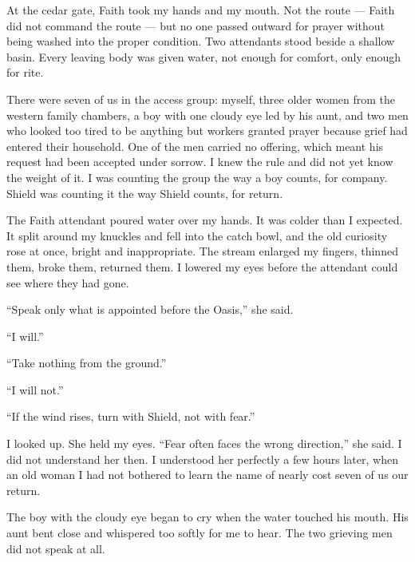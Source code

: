 At the cedar gate, Faith took my hands and my mouth. Not the route --- Faith did not command the route --- but no one passed outward for prayer without being washed into the proper condition. Two attendants stood beside a shallow basin. Every leaving body was given water, not enough for comfort, only enough for rite.\par

There were seven of us in the access group: myself, three older women from the western family chambers, a boy with one cloudy eye led by his aunt, and two men who looked too tired to be anything but workers granted prayer because grief had entered their household. One of the men carried no offering, which meant his request had been accepted under sorrow. I knew the rule and did not yet know the weight of it. I was counting the group the way a boy counts, for company. Shield was counting it the way Shield counts, for return.\par

The Faith attendant poured water over my hands. It was colder than I expected. It split around my knuckles and fell into the catch bowl, and the old curiosity rose at once, bright and inappropriate. The stream enlarged my fingers, thinned them, broke them, returned them. I lowered my eyes before the attendant could see where they had gone.\par

``Speak only what is appointed before the Oasis,'' she said.\par

``I will.''\par

``Take nothing from the ground.''\par

``I will not.''\par

``If the wind rises, turn with Shield, not with fear.''\par

I looked up. She held my eyes. ``Fear often faces the wrong direction,'' she said. I did not understand her then. I understood her perfectly a few hours later, when an old woman I had not bothered to learn the name of nearly cost seven of us our return.\par

The boy with the cloudy eye began to cry when the water touched his mouth. His aunt bent close and whispered too softly for me to hear. The two grieving men did not speak at all.\par

